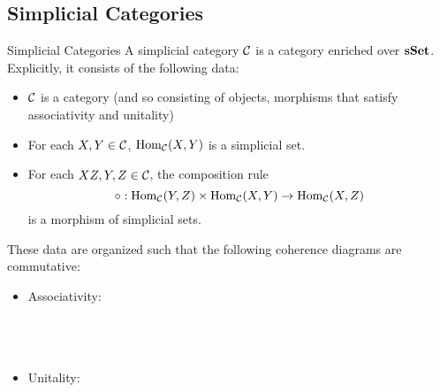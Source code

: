 \documentclass[a4paper]{article}
\begin{document}
\subsection{Simplicial Categories}
\begin{defn}{Simplicial Categories}{} A simplicial category $\mathcal{C}$ is a category enriched over $\bold{sSet}$. Explicitly, it consists of the following data: 
\begin{itemize}
\item $\mathcal{C}$ is a category (and so consisting of objects, morphisms that satisfy associativity and unitality)
\item For each $X,Y\in\mathcal{C}$, $\operatorname{Hom}_{\mathcal{C}}(X,Y)$ is a simplicial set. 
\item For each $XZ,Y,Z\in\mathcal{C}$, the composition rule $$\circ:\operatorname{Hom}_{\mathcal{C}}(Y,Z)\times\operatorname{Hom}_{\mathcal{C}}(X,Y)\to\operatorname{Hom}_{\mathcal{C}}(X,Z)$$ is a morphism of simplicial sets. 
\end{itemize}
These data are organized such that the following coherence diagrams are commutative: 
\begin{itemize}
\item Associativity: \\~\\
\\~\\
\item Unitality: \\~\\
\\~\\
\end{itemize}
\end{defn}
\end{document}
